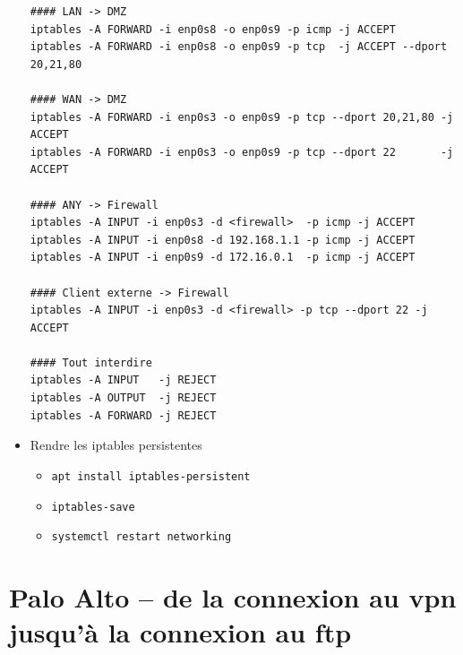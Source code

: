 \documentclass[a4paper]{article}
\begin{document}
\begin{itemize}
\begin{example}
\begin{verbatim}
#### LAN -> DMZ
iptables -A FORWARD -i enp0s8 -o enp0s9 -p icmp -j ACCEPT
iptables -A FORWARD -i enp0s8 -o enp0s9 -p tcp  -j ACCEPT --dport 20,21,80

#### WAN -> DMZ
iptables -A FORWARD -i enp0s3 -o enp0s9 -p tcp --dport 20,21,80 -j ACCEPT
iptables -A FORWARD -i enp0s3 -o enp0s9 -p tcp --dport 22       -j ACCEPT

#### ANY -> Firewall
iptables -A INPUT -i enp0s3 -d <firewall>  -p icmp -j ACCEPT
iptables -A INPUT -i enp0s8 -d 192.168.1.1 -p icmp -j ACCEPT
iptables -A INPUT -i enp0s9 -d 172.16.0.1  -p icmp -j ACCEPT

#### Client externe -> Firewall
iptables -A INPUT -i enp0s3 -d <firewall> -p tcp --dport 22 -j ACCEPT

#### Tout interdire
iptables -A INPUT   -j REJECT
iptables -A OUTPUT  -j REJECT
iptables -A FORWARD -j REJECT
\end{verbatim} \end{example}


\item Rendre les iptables persistentes
\begin{example} \begin{itemize}
    \item \texttt{apt install iptables-persistent}
    \item \texttt{iptables-save}
    \item \texttt{systemctl restart networking}
\end{itemize} \end{example}


\end{itemize}















\newpage \section{Palo Alto -- de la connexion au vpn jusqu'à la connexion au ftp}
\end{document}
